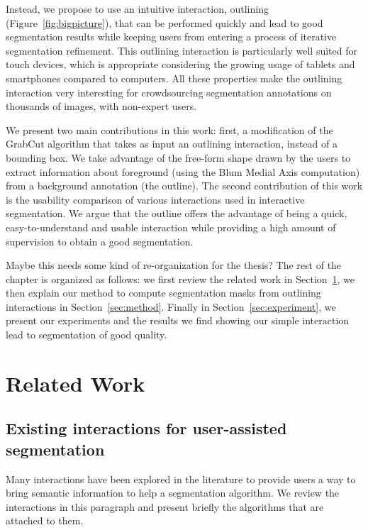 Instead, we propose to use an intuitive interaction,
outlining (Figure~\ref{fig:bigpicture}),
that can be performed quickly and lead to good segmentation results
while keeping users from entering a process
of iterative segmentation refinement.
This outlining interaction is particularly well suited
for touch devices, which is appropriate considering the growing
usage of tablets and smartphones compared to computers.
All these properties make the outlining interaction very interesting
for crowdsourcing segmentation annotations on thousands of images,
with non-expert users.


We present two main contributions in this work:
first, a modification of the GrabCut algorithm
that takes as input an outlining interaction, instead of a bounding box.
We take advantage of the free-form shape drawn by the users
to extract information about foreground
(using the Blum Medial Axis computation)
from a background annotation (the outline).
The second contribution of this work is the usability comparison
of various interactions used in interactive segmentation.
We argue that the outline offers the advantage of being a quick,
easy-to-understand and usable interaction while providing
a high amount of supervision to obtain a good segmentation.


\alert{Maybe this needs some kind of re-organization for the thesis?}
The rest of the chapter is organized as follows:
we first review the related work in Section~\ref{sec:soa},
we then explain our method to compute segmentation masks
from outlining interactions in Section~\ref{sec:method}.
Finally in Section~\ref{sec:experiment},
we present our experiments and the results we find
showing our simple interaction lead to segmentation of good quality.


\section{Related Work}%
\label{sec:soa}


\subsection{Existing interactions for user-assisted segmentation}


Many interactions have been explored in the literature
to provide users a way to bring semantic information
to help a segmentation algorithm.
We review the interactions in this paragraph
and present briefly the algorithms that are attached to them.


